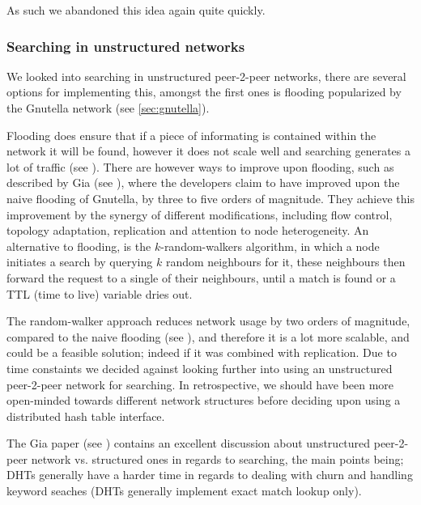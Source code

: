 As such we abandoned this idea again quite quickly.

\subsubsection{Searching in unstructured networks}
We looked into searching in unstructured peer-2-peer networks, there are
several options for implementing this, amongst the first ones is flooding
popularized by the Gnutella network (see \ref{sec:gnutella}).

Flooding does ensure that if a piece of informating is contained within the 
network it will be found, however it does not scale well and searching 
generates a lot of traffic (see \citep{Lv:Searching}).
\newline
There are however ways to improve upon flooding, such as described by Gia 
(see \citep{Chawathe:Gia}), where the developers claim to have improved upon
the naive flooding of Gnutella, by three to five orders of magnitude.
They achieve this improvement by the synergy of different modifications,
including flow control, topology adaptation, replication and attention to node
heterogeneity.
\newline\newline
An alternative to flooding, is the $k$-random-walkers algorithm, in which a 
node initiates a search by querying $k$ random neighbours for it, these
neighbours then forward the request to a single of their neighbours, until a 
match is found or a TTL (time to live) variable dries out.

The random-walker approach reduces network usage by two orders of magnitude,
compared to the naive flooding (see \citep{Lv:Searching}), and therefore it is
a lot more scalable, and could be a feasible solution; indeed if it was
combined with replication.
\newline\newline
Due to time constaints we decided against looking further into using an
unstructured peer-2-peer network for searching. In retrospective, we should
have been more open-minded towards different network structures before deciding
upon using a distributed hash table interface.

The Gia paper (see \citep{Chawathe:Gia}) contains an excellent discussion about
unstructured peer-2-peer network vs. structured ones in regards to searching,
the main points being; DHTs generally have a harder time in regards to dealing
with churn and handling keyword seaches (DHTs generally implement exact match
lookup only).

